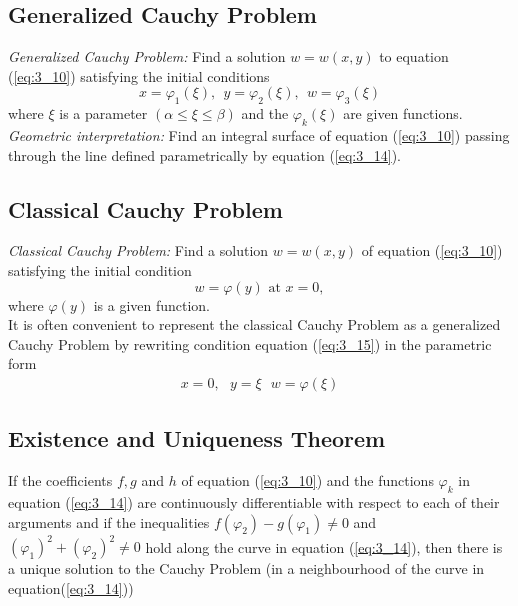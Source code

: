 \documentclass[11pt]{report}
\newcommand{\refn}[1]{(\ref{#1})}
\newcommand{\refx}[1]{\refn{eq:#1}}
\begin{document}
	\subsection{Generalized Cauchy Problem}
	\textit{Generalized Cauchy Problem:} Find a solution $w=w(x,y)$ to equation \refx{3_10} satisfying the initial conditions
	\begin{equation}
		x=\varphi_1(\xi), ~~ y=\varphi_2(\xi), ~~ w=\varphi_3(\xi)\label{eq:3_14}
	\end{equation}
	where $\xi$ is a parameter $(\alpha \leq \xi \leq \beta)$ and the $\varphi_k(\xi)$ are given functions.\\
	
	\textit{Geometric interpretation:} Find an integral surface of equation \refx{3_10} passing through the line defined parametrically by equation \refx{3_14}.\\
	
	\subsection{Classical Cauchy Problem}
	\textit{Classical Cauchy Problem:} Find a solution $w=w(x,y)$ of equation \refx{3_10} satisfying the initial condition
	\begin{equation}
		w=\varphi(y) \text{ at } x=0, \label{eq:3_15}
	\end{equation}
	where $\varphi(y)$ is a given function.\\
	It is often convenient to represent the classical Cauchy Problem as a generalized Cauchy Problem by rewriting condition equation \refx{3_15} in the parametric form
	\begin{eqnarray*}
		x=0, ~~~ y=\xi~~~ w=\varphi(\xi)
	\end{eqnarray*}
	
	\subsection{Existence and Uniqueness Theorem}
	If the coefficients $f,g$ and $h$ of equation \refx{3_10}  and the functions $\varphi_k$ in equation \refx{3_14} are continuously differentiable with respect to each of their arguments and if the inequalities $f(\varphi_2) - g(\varphi_1) \neq 0$ and $(\varphi_1)^2 + (\varphi_2)^2 \neq 0$ hold along the curve in equation \refx{3_14}, then there is a unique solution to the Cauchy Problem (in a neighbourhood of the curve in equation\refx{3_14})
	
\end{document}
